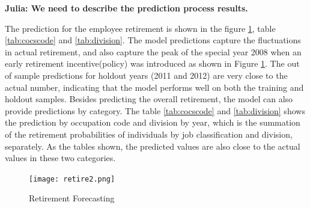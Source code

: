 \documentclass[12pt,letterpaper]{article}
\begin{document}
{\bf Julia: We need to describe the prediction process results.}

The prediction for the employee retirement is shown in the figure \ref{fig:predict}, table \ref{tab:cocscode} and \ref{tab:division}. The model predictions capture the fluctuations in actual retirement, and also capture the peak of the special year 2008 when an early retirement incentive(policy) was introduced as shown in Figure \ref{fig:predict}. The out of sample predictions for holdout years (2011 and 2012) are very close to the actual number, indicating that the model performs well on both the training and holdout samples. Besides predicting the overall retirement, the model can also provide predictions by category. The table \ref{tab:cocscode} and \ref{tab:division} shows the prediction by occupation code and division by year, which is the summation of the retirement probabilities of individuals by job classification and division, separately. As the tables shown, the predicted values are also close to the actual values in these two categories.

\begin{figure}[h!]
	\centering
	\texttt{[image: retire2.png]}
	\caption{Retirement Forecasting}
	\label{fig:predict}	
	
\end{figure}
\end{document}
